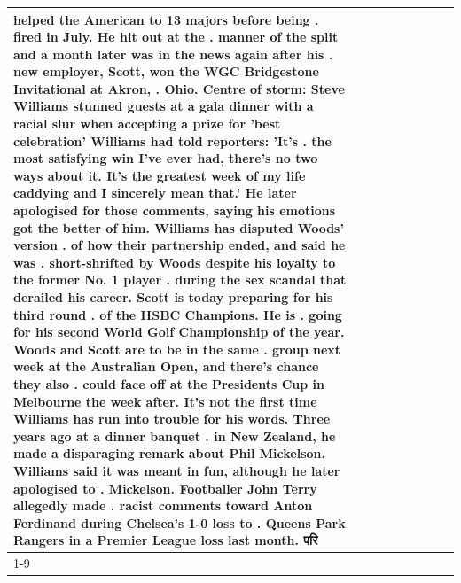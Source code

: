 \begin{table}[H]
\begin{tabular}{lllrlllll}
helped the American to 13 majors before being . fired in July. He hit out at the . manner of the split and a month later was in the news again after his . new employer, Scott, won the WGC Bridgestone Invitational at Akron, . Ohio. Centre of storm: Steve Williams stunned guests at a gala dinner with a racial slur when accepting a prize for 'best celebration' Williams had told reporters: 'It's . the most satisfying win I've ever had, there's no two ways about it. It's the greatest week of my life caddying and I sincerely mean that.' He later apologised for those comments, saying his emotions got the better of him. Williams has disputed Woods' version . of how their partnership ended, and said he was . short-shrifted by Woods despite his loyalty to the former No. 1 player . during the sex scandal that derailed his career. Scott is today preparing for his third round . of the HSBC Champions. He is . going for his second World Golf Championship of the year. Woods and Scott are to be in the same . group next week at the Australian Open, and there's chance they also . could face off at the Presidents Cup in Melbourne the week after. It's not the first time Williams has run into trouble for his words. Three years ago at a dinner banquet . in New Zealand, he made a disparaging remark about Phil Mickelson. Williams said it was meant in fun, although he later apologised to . Mickelson. Footballer John Terry allegedly made . racist comments toward Anton Ferdinand during Chelsea's 1-0 loss to . Queens Park Rangers in a Premier League loss last month. परि \\
\cline{1-9}

\end{tabular}
\end{table}
